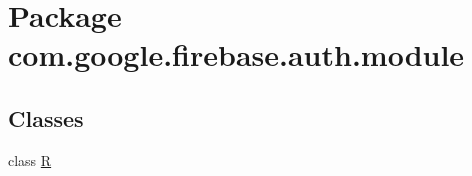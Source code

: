\hypertarget{namespacecom_1_1google_1_1firebase_1_1auth_1_1module}{}\section{Package com.\+google.\+firebase.\+auth.\+module}
\label{namespacecom_1_1google_1_1firebase_1_1auth_1_1module}
\subsection*{Classes}
\begin{DoxyCompactItemize}
\item 
class \mbox{\hyperlink{classcom_1_1google_1_1firebase_1_1auth_1_1module_1_1R}{R}}
\end{DoxyCompactItemize}

